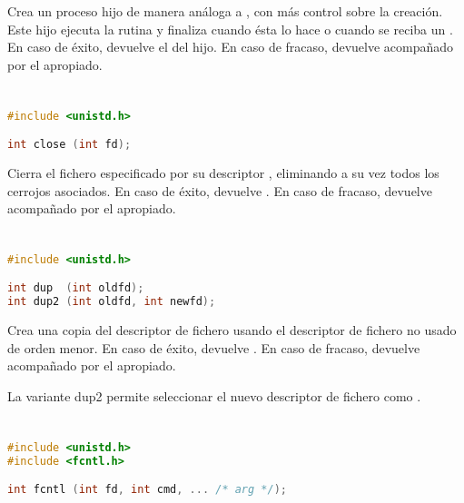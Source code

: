 Crea un proceso hijo de manera análoga a , con más control sobre la creación.
Este hijo ejecuta la rutina  y finaliza cuando ésta lo hace o cuando se reciba un .
En caso de éxito, devuelve el  del hijo.
En caso de fracaso, devuelve  acompañado por el  apropiado.

\pagebreak

\section{}\label{close}

\begin{lstlisting}[language=C]
#include <unistd.h>

int close (int fd);
\end{lstlisting}

Cierra el fichero especificado por su descriptor , eliminando a su vez todos los cerrojos asociados.
En caso de éxito, devuelve .
En caso de fracaso, devuelve  acompañado por el  apropiado.

\section{}\label{dup}

\begin{lstlisting}[language=C]
#include <unistd.h>

int dup  (int oldfd);
int dup2 (int oldfd, int newfd);
\end{lstlisting}

Crea una copia del descriptor de fichero  usando el descriptor de fichero no usado de orden menor.
En caso de éxito, devuelve .
En caso de fracaso, devuelve  acompañado por el  apropiado.

La variante dup2 permite seleccionar el nuevo descriptor de fichero como .

\section{}\label{fcntl}

\begin{lstlisting}[language=C]
#include <unistd.h>
#include <fcntl.h>

int fcntl (int fd, int cmd, ... /* arg */);
\end{lstlisting}

